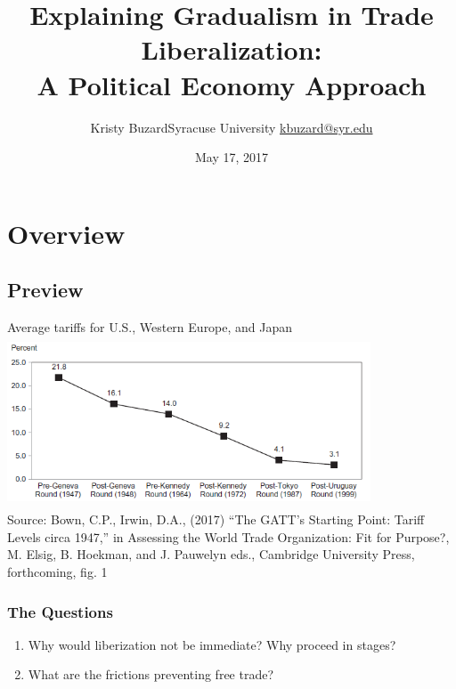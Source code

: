 \documentclass[handout]{beamer}
\title[Explaining Gradualism in Trade Liberalization \hspace{2.5in}\insertframenumber/\inserttotalframenumber]{Explaining Gradualism in Trade Liberalization: \\A Political Economy Approach}
\author[Kristy Buzard]{\texorpdfstring{Kristy Buzard\newline Syracuse University  \newline\url{kbuzard@syr.edu}}{Kristy Buzard}}
\date{May 17, 2017}
\begin{document}
\maketitle




\section{Overview}
\subsection{Preview}

\begin{frame}{Average tariffs for U.S., Western Europe, and Japan}
	\includegraphics[height=2in, width=4.25in]{linegraph-Bown-Irwin.png} \\
	\scriptsize Source: Bown, C.P., Irwin, D.A., (2017) ``The GATT's Starting Point: Tariff Levels circa 1947,'' in Assessing the World Trade Organization: Fit for Purpose?, M. Elsig, B. Hoekman, and J. Pauwelyn eds., Cambridge University Press, forthcoming, fig. 1
\end{frame}

\begin{frame}
\frametitle{The Questions}
\pause
\begin{enumerate}[<+->]
	\item Why would liberization not be immediate? Why proceed in stages?
  \item What are the frictions preventing free trade? %
\end{enumerate}
\end{frame}
\end{document}
